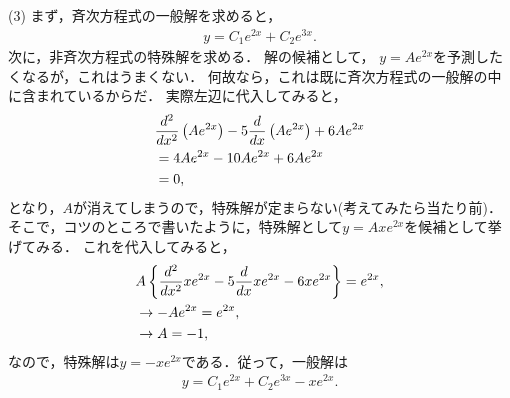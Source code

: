 \noindent
(3) まず，斉次方程式の一般解を求めると，
\begin{align}
  y = C_1 e^{2x} + C_2 e^{3x}. 
\end{align}
%
次に，非斉次方程式の特殊解を求める．
解の候補として，
$y=Ae^{2x}$を予測したくなるが，これはうまくない．
何故なら，これは既に斉次方程式の一般解の中に含まれているからだ．
実際左辺に代入してみると，
\begin{align}
  &\dfrac{d^2}{dx^2}\left(Ae^{2x}\right) - 5 \dfrac{d}{dx}\left(Ae^{2x}\right) + 6Ae^{2x} \notag \\
  &=4Ae^{2x} -10Ae^{2x} + 6 Ae^{2x} \notag \\
  &=0, 
\end{align}
となり，$A$が消えてしまうので，特殊解が定まらない(考えてみたら当たり前)．
そこで，コツのところで書いたように，特殊解として$y=Axe^{2x}$を候補として挙げてみる．
これを代入してみると，
\begin{align}
 &A\left\{ \dfrac{d^2}{dx^2}xe^{2x} - 5 \dfrac{d}{dx}xe^{2x} - 6 xe^{2x}\right\}  = e^{2x}, \notag \\
 &\rightarrow -Ae^{2x} = e^{2x}, \notag \\
 &\rightarrow A = -1, 
\end{align}
なので，特殊解は$y=-xe^{2x}$である．従って，一般解は
\begin{align}
 y = C_1 e^{2x} + C_2 e^{3x} - x e^{2x}. 
\end{align}
%
\newpage
%

